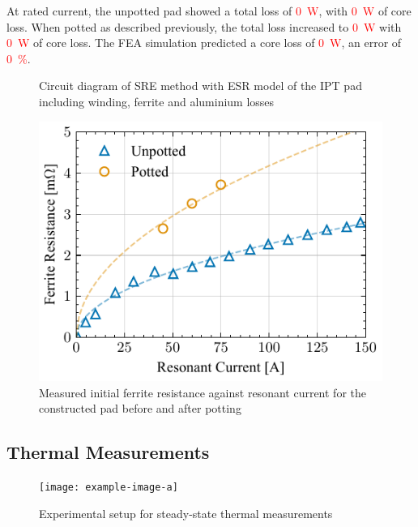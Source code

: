 \documentclass[conference]{IEEEtran}
\begin{document}
At rated current, the unpotted pad showed a total loss of \textcolor{red}{\SI{0}{\watt}}, with \textcolor{red}{\SI{0}{\watt}} of core loss.
When potted as described previously, the total loss increased to \textcolor{red}{\SI{0}{\watt}} with \textcolor{red}{\SI{0}{\watt}} of core loss. 
The FEA simulation predicted a core loss of \textcolor{red}{\SI{0}{\watt}}, an error of \textcolor{red}{\SI{0}{\percent}}. 

\lipsum[1]

\begin{figure}[t]
  
  \caption{Circuit diagram of SRE method with ESR model of the IPT pad including winding, ferrite and aluminium losses}
  \label{fig:sremethodcircuitdiagram}
\end{figure}

\begin{figure}[t]
  \includegraphics{figures/24-10-17_initialFerriteResistanceComparisonV2.pdf}
  \caption{Measured initial ferrite resistance against resonant current for the constructed pad before and after potting}
  \label{fig:initialFerriteResistanceComparison}
\end{figure}

\subsection{Thermal Measurements}

\lipsum[2]

\begin{figure}[t]
  \centering
  \texttt{[image: example-image-a]}
  \caption{Experimental setup for steady-state thermal measurements}
  \label{fig:thermalexperimentalsetup}
\end{figure}
\end{document}
